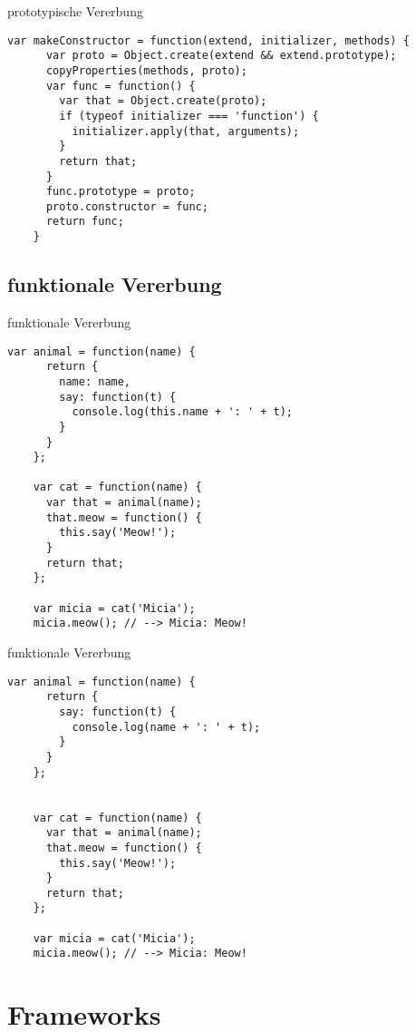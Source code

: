 \begin{frame}[fragile]{prototypische Vererbung}
  \begin{lstlisting}[gobble=4]
    var makeConstructor = function(extend, initializer, methods) {
      var proto = Object.create(extend && extend.prototype);
      copyProperties(methods, proto);
      var func = function() {
        var that = Object.create(proto);
        if (typeof initializer === 'function') {
          initializer.apply(that, arguments);
        }
        return that;
      }
      func.prototype = proto;
      proto.constructor = func;
      return func;
    }
  \end{lstlisting}
\end{frame}

\subsection{funktionale Vererbung}

\begin{frame}[fragile]{funktionale Vererbung}
  \begin{lstlisting}[gobble=4]
    var animal = function(name) {
      return {
        name: name,
        say: function(t) {
          console.log(this.name + ': ' + t);
        }
      }
    };
    
    var cat = function(name) {
      var that = animal(name);
      that.meow = function() {
        this.say('Meow!');
      }
      return that;
    };
    
    var micia = cat('Micia');
    micia.meow(); // --> Micia: Meow!
  \end{lstlisting}
\end{frame}

\begin{frame}[fragile]{funktionale Vererbung}
  \begin{lstlisting}[gobble=4]
    var animal = function(name) {
      return {
        say: function(t) {
          console.log(name + ': ' + t);
        }
      }
    };

    
    var cat = function(name) {
      var that = animal(name);
      that.meow = function() {
        this.say('Meow!');
      }
      return that;
    };
    
    var micia = cat('Micia');
    micia.meow(); // --> Micia: Meow!
  \end{lstlisting}
\end{frame}

\section{Frameworks}

